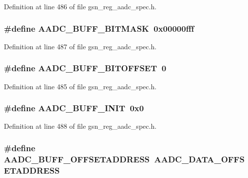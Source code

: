 Definition at line 486 of file gsn\_\-reg\_\-aadc\_\-spec.h.

\hypertarget{a00543_a3971c4512feed41eb6cdda2773331dbd}{
\subsubsection[{AADC\_\-BUFF\_\-BITMASK}]{\setlength{\rightskip}{0pt plus 5cm}\#define AADC\_\-BUFF\_\-BITMASK~0x00000fff}}
\label{a00543_a3971c4512feed41eb6cdda2773331dbd}


Definition at line 487 of file gsn\_\-reg\_\-aadc\_\-spec.h.

\hypertarget{a00543_a3265997496e1cee7dcc0ab06218dfc1a}{
\subsubsection[{AADC\_\-BUFF\_\-BITOFFSET}]{\setlength{\rightskip}{0pt plus 5cm}\#define AADC\_\-BUFF\_\-BITOFFSET~0}}
\label{a00543_a3265997496e1cee7dcc0ab06218dfc1a}


Definition at line 485 of file gsn\_\-reg\_\-aadc\_\-spec.h.

\hypertarget{a00543_af3e823bcb52c40b3f7974cb0bf421779}{
\subsubsection[{AADC\_\-BUFF\_\-INIT}]{\setlength{\rightskip}{0pt plus 5cm}\#define AADC\_\-BUFF\_\-INIT~0x0}}
\label{a00543_af3e823bcb52c40b3f7974cb0bf421779}


Definition at line 488 of file gsn\_\-reg\_\-aadc\_\-spec.h.

\hypertarget{a00543_af5d2a78674198148bbe174c241345bb2}{
\subsubsection[{AADC\_\-BUFF\_\-OFFSETADDRESS}]{\setlength{\rightskip}{0pt plus 5cm}\#define AADC\_\-BUFF\_\-OFFSETADDRESS~AADC\_\-DATA\_\-OFFSETADDRESS}}
\label{a00543_af5d2a78674198148bbe174c241345bb2}


